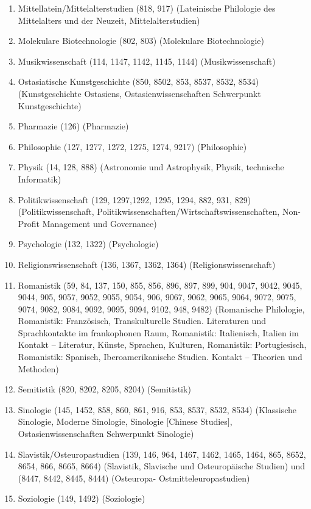 \begin{enumerate}[noitemsep]
        \item Mittellatein/Mittelalterstudien (818, 917) (Lateinische Philologie des Mittelalters und der Neuzeit, Mittelalterstudien) 
        \item Molekulare Biotechnologie (802, 803) (Molekulare Biotechnologie) 
        \item Musikwissenschaft (114, 1147, 1142, 1145, 1144) (Musikwissenschaft) 
        \item Ostasiatische Kunstgeschichte (850, 8502, 853, 8537, 8532, 8534) (Kunstgeschichte Ostasiens, Ostasienwissenschaften Schwerpunkt Kunstgeschichte) 
        \item Pharmazie (126) (Pharmazie) 
        \item Philosophie (127, 1277, 1272, 1275, 1274, 9217) (Philosophie) 
        \item Physik (14, 128, 888) (Astronomie und Astrophysik, Physik, technische Informatik) 
        \item Politikwissenschaft (129, 1297,1292, 1295, 1294, 882, 931, 829) (Politikwissenschaft, Politikwissenschaften/Wirtschaftswissenschaften, Non-Profit Management und Governance) 
        \item Psychologie (132, 1322) (Psychologie) 
        \item Religionswissenschaft (136, 1367, 1362, 1364) (Religionswissenschaft) 
        \item Romanistik (59, 84, 137, 150, 855, 856, 896, 897, 899, 904, 9047, 9042, 9045, 9044, 905, 9057, 9052, 9055, 9054, 906, 9067, 9062, 9065, 9064, 9072, 9075, 9074, 9082, 9084, 9092, 9095, 9094, 9102, 948, 9482) (Romanische Philologie, Romanistik: Französisch, Transkulturelle Studien. Literaturen und Sprachkontakte im frankophonen Raum, Romanistik: Italienisch, Italien im Kontakt – Literatur, Künste, Sprachen, Kulturen, Romanistik: Portugiesisch, Romanistik: Spanisch, Iberoamerikanische Studien. Kontakt – Theorien und Methoden) 
        \item Semitistik (820, 8202, 8205, 8204) (Semitistik)
        \item Sinologie (145, 1452, 858, 860, 861, 916, 853, 8537, 8532, 8534) (Klassische Sinologie, Moderne Sinologie, Sinologie [Chinese Studies], Ostasienwissenschaften Schwerpunkt Sinologie) 
        \item Slavistik/Osteuropastudien (139, 146, 964, 1467, 1462, 1465, 1464, 865, 8652, 8654, 866, 8665, 8664) (Slavistik, Slavische und Osteuropäische Studien) und (8447, 8442, 8445, 8444) (Osteuropa- Ostmitteleuropastudien) 
        \item Soziologie (149, 1492) (Soziologie) 

\end{enumerate}
